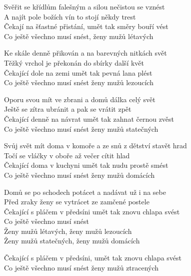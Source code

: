 
\ve{}
Svěřit se křídlům falešným a silou nečistou se vznést\\
A najít pole božích vín to stojí někdy trest\\
Čekají na šťastné přistání, umět tak směry bouří vést\\	
Co ještě všechno musí snést, ženy mužů létavých

\ve{}
Ke skále denně přikován a na barevných nitkách svět\\
Těžký vrchol je překonán do sbírky další květ\\
Čekající dole na zemi umět tak pevná lana plést\\
Co ještě všechno musí snést ženy mužů lezoucích

\ve{}
Oporu svou mít ve zbrani a domů dálka celý svět\\
Ještě se zítra ubránit a pak se vrátit zpět\\
Čekající denně na návrat umět tak zahnat černou zvěst\\
Co ještě všechno musí snést ženy mužů statečných

\ve{}
Svůj svět mít doma v komoře a ze snů z dětství stavět hrad\\
Točí se vláčky v oboře až večer cítit hlad\\
Čekající doma v kuchyni umět tak nudu prostě smést\\
Co ještě všechno musí snést ženy mužů domácích

\ve{}
Domů se po schodech potácet a nadávat už i na sebe\\
Před zraky ženy se vytrácet ze zamčené postele\\
Čekající s pláčem v předsíni umět tak znovu chlapa svést\\
Co ještě všechno musí snést\\
Ženy mužů létavých, ženy mužů lezoucích\\
Ženy mužů statečných, ženy mužů domácích

\re{}
Čekající s pláčem v předsíni, umět tak znovu chlapa svést\\
Co ještě všechno musí snést ženy mužů ztracených

\esong